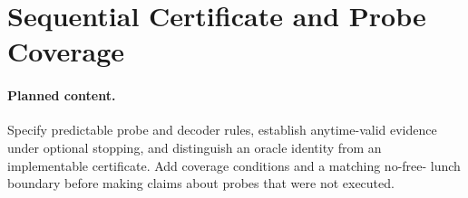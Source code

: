 \section{Sequential Certificate and Probe Coverage}
\label{sec:sequential-certificate}

\paragraph{Planned content.}
Specify predictable probe and decoder rules, establish anytime-valid evidence
under optional stopping, and distinguish an oracle identity from an
implementable certificate. Add coverage conditions and a matching no-free-
lunch boundary before making claims about probes that were not executed.
